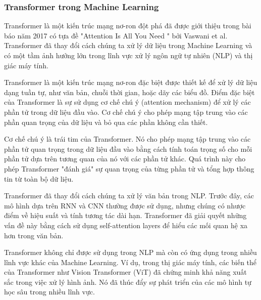 \documentclass{article} %
\begin{document}
\subsubsection{Transformer trong Machine Learning}

Transformer \cite{vaswani2023attention} là một kiến trúc mạng nơ-ron đột phá đã được giới thiệu trong bài báo năm 2017 có tựa đề "Attention Is All You Need \cite{vaswani2023attention}" bởi Vaswani et al. Transformer đã thay đổi cách chúng ta xử lý dữ liệu trong Machine Learning và có một tầm ảnh hưởng lớn trong lĩnh vực xử lý ngôn ngữ tự nhiên (NLP) và thị giác máy tính.

Transformer là một kiến trúc mạng nơ-ron đặc biệt được thiết kế để xử lý dữ liệu dạng tuần tự, như văn bản, chuỗi thời gian, hoặc dãy các biểu đồ. Điểm đặc biệt của Transformer là sự sử dụng cơ chế chú ý (attention mechanism) để xử lý các phần tử trong dữ liệu đầu vào. Cơ chế chú ý cho phép mạng tập trung vào các phần quan trọng của dữ liệu và bỏ qua các phần không cần thiết.


Cơ chế chú ý là trái tim của Transformer. Nó cho phép mạng tập trung vào các phần tử quan trọng trong dữ liệu đầu vào bằng cách tính toán trọng số cho mỗi phần tử dựa trên tương quan của nó với các phần tử khác. Quá trình này cho phép Transformer "đánh giá" sự quan trọng của từng phần tử và tổng hợp thông tin từ toàn bộ dữ liệu.

Transformer đã thay đổi cách chúng ta xử lý văn bản trong NLP. Trước đây, các mô hình dựa trên RNN và CNN thường được sử dụng, nhưng chúng có nhược điểm về hiệu suất và tính tương tác dài hạn. Transformer đã giải quyết những vấn đề này bằng cách sử dụng self-attention layers để hiểu các mối quan hệ xa hơn trong văn bản.

Transformer không chỉ được sử dụng trong NLP mà còn có ứng dụng trong nhiều lĩnh vực khác của Machine Learning. Ví dụ, trong thị giác máy tính, các biến thể của Transformer như Vision Transformer (ViT) đã chứng minh khả năng xuất sắc trong việc xử lý hình ảnh. Nó đã thúc đẩy sự phát triển của các mô hình tự học sâu trong nhiều lĩnh vực.
\end{document}
